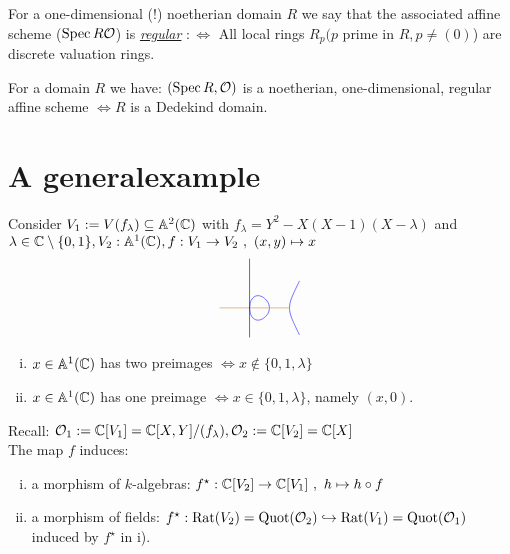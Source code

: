 \begin{defi}
For a one-dimensional (!) noetherian domain $R$ we say that the associated affine scheme ($\operatorname{Spec} R \mathcal{O}$) is \emph{\underline{regular}} $:\iff$ All local rings $R_p (p $ prime in $R, p \neq (0)$) are discrete valuation rings.
\end{defi}

\begin{Beob}
For a domain $R$ we have: $(\operatorname{Spec} R, \mathcal{O})$ is a noetherian, one-dimensional, regular affine scheme $\iff R$ is a Dedekind domain.
\end{Beob}

\section{A \glqq general\grqq example}
\begin{Bsp}
Consider $V_1:=V(f_\lambda) \subseteq \mathbb{A}^2(\mathbb{C})$ with $f_\lambda=Y^2-X(X-1)(X-\lambda)$ and $\lambda \in \mathbb{C} \setminus \{0,1\}, V_2:\mathbb{A}^1(\mathbb{C}), f:V_1 \to V_2 \ , \ (x,y) \mapsto x$
\[ \begin{tikzpicture}[scale=0.5]
\draw[brown](-1.5,0) -- (2,0);
\draw(0,-1.5) -- (0,2.5);
\draw[smooth, domain=0:1, variable=\x,blue] plot ({\x},{sqrt(\x*(\x-1)*(\x-2))});
\draw[smooth, domain=2:2.5, variable=\x,blue] plot ({\x},{sqrt(\x*(\x-1)*(\x-2))});
\draw[smooth, domain=0:1, variable=\x,blue] plot ({\x},{-sqrt(\x*(\x-1)*(\x-2))});
\draw[smooth, domain=2:2.5, variable=\x,blue] plot ({\x},{-sqrt(\x*(\x-1)*(\x-2))});
\end{tikzpicture}
\]
\end{Bsp}

\begin{Bem}
\begin{enumerate}[i)]
\item $x \in \mathbb{A}^1(\mathbb{C})$ has two preimages $\iff x \not \in \{0,1,\lambda\}$
\item $x \in \mathbb{A}^1(\mathbb{C})$ has one preimage $\iff x \in \{0,1,\lambda\}$, namely $(x,0)$.
\end{enumerate}
\end{Bem}

\begin{Bem}
Recall: $\mathcal{O}_1:=\mathbb{C}[V_1]=\mathbb{C}[X,Y]/(f_\lambda), \mathcal{O}_2:=\mathbb{C}[V_2]=\mathbb{C}[X]$\\
The map $f$ induces:
\begin{enumerate}[i)]
\item a morphism of $k$-algebras: $f^\star: \mathbb{C}[V_2] \to \mathbb{C}[V_1] \ , \ h \mapsto h \circ f$
\item a morphism of fields: $f^\star: \operatorname{Rat}(V_2) = \operatorname{Quot}(\mathcal{O}_2) \hookrightarrow \operatorname{Rat}(V_1)=\operatorname{Quot}(\mathcal{O}_1)$ induced by $f^\star$ in i).
\end{enumerate}
\end{Bem}

